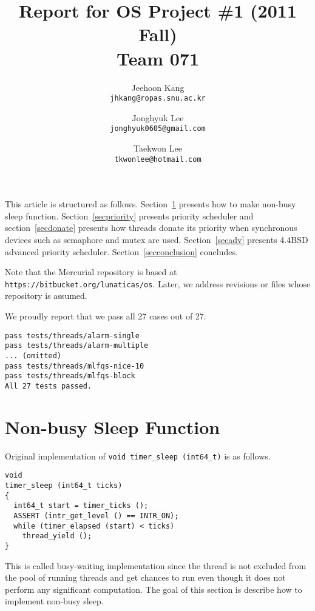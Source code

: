 \documentclass[a4paper,article,11pt,oneside]{article}
\begin{document}
\title{Report for OS Project \#1 (2011 Fall)\\Team 071}
\author{Jeehoon Kang\\\texttt{jhkang@ropas.snu.ac.kr}\and Jonghyuk Lee\\\texttt{jonghyuk0605@gmail.com} \and Taekwon Lee\\\texttt{tkwonlee@hotmail.com} }
\maketitle

This article is structured as follows. Section~\ref{secsleep} presents how to
make non-busy sleep function. Section~\ref{secpriority}
presents priority scheduler and section~\ref{secdonate} presents how
threads donate its priority when synchronous devices such as semaphore
and mutex are used. Section~\ref{secadv} presents 4.4BSD advanced
priority scheduler. Section~\ref{secconclusion} concludes.

Note that the Mercurial repository is based at
\texttt{https://bitbucket.org/lunaticas/os}. Later, we address
revisions or files whose repository is assumed.

We proudly report that we pass all 27 cases out of 27.
\begin{verbatim}
pass tests/threads/alarm-single
pass tests/threads/alarm-multiple
... (omitted)
pass tests/threads/mlfqs-nice-10
pass tests/threads/mlfqs-block
All 27 tests passed.
\end{verbatim}

\section{Non-busy Sleep Function}\label{secsleep}
Original implementation of \texttt{void
    timer\_sleep (int64\_t)} is as follows.
\begin{verbatim}
void
timer_sleep (int64_t ticks) 
{
  int64_t start = timer_ticks ();
  ASSERT (intr_get_level () == INTR_ON);
  while (timer_elapsed (start) < ticks) 
    thread_yield ();
}
\end{verbatim}
This is called busy-waiting implementation since the thread is not
excluded from the pool of running threads and get chances to run even
though it does not perform any significant computation. The goal of
this section is describe how to implement non-busy sleep.
\end{document}
